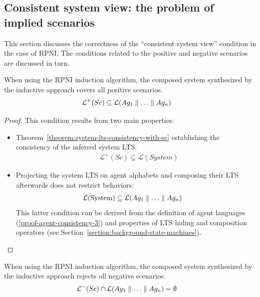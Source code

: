 
\subsection{Consistent system view: the problem of implied scenarios\label{subsection:consistent-system-view}}

This section discusses the correctness of the ``consistent system view'' condition in the case of RPNI. The conditions related to the positive and negative scenarios are discussed in turn.

\begin{theorem}
When using the RPNI induction algorithm, the composed system synthesized by the inductive approach covers all positive scenarios.
\begin{align*}
&\mathcal{L}^+(Sc) \subseteq \mathcal{L}(Ag_1 \parallel \ldots \parallel Ag_n)
\end{align*}

\begin{proof}
This condition results from two main properties:
\begin{itemize}
\item Theorem~\ref{theorem:system-lts-consistency-with-sc} establishing the consistency of the inferred system LTS.
\begin{align*}
&\mathcal{L}^+(Sc) \subseteq \mathcal{L}(System)
\end{align*}
\item Projecting the system LTS on agent alphabets and composing their LTS afterwards does not restrict behaviors:
\begin{align*}
&\mathcal{L}(\mbox{System}) \subseteq \mathcal{L}(Ag_1 \parallel \ldots \parallel Ag_n)
\end{align*}
This latter condition can be derived from the definition of agent languages (\ref{proof-agent-consistency-3}) and properties of LTS hiding and composition operators (see Section~\ref{section:background-state-machines}).
\end{itemize} 

\end{proof}
\end{theorem}

\begin{theorem}[Candidate]
When using the RPNI induction algorithm, the composed system synthesized by the inductive approach rejects all negative scenarios.\label{theorem:consistent-system-view-negative}
\begin{align*}
&\mathcal{L}^-(Sc) \cap \mathcal{L}(Ag_1 \parallel \ldots \parallel Ag_n) = \emptyset
\end{align*}
\end{theorem}

